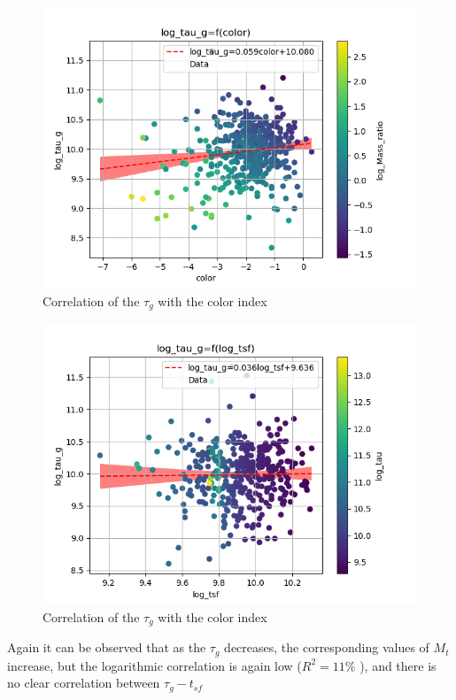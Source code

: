 \documentclass[a4paper,twocolumn]{article}
\begin{document}
\begin{figure}[!htpb]
\centering
\includegraphics[width=.9\linewidth]{./figs/color-log_tau_g-color_log_Mass_ratio.png}
\caption{\label{fig:Correlation of the $\tau_g$ with the color index}Correlation of the \(\tau_g\) with the color index}
\end{figure}

\begin{figure}[!htpb]
\centering
\includegraphics[width=.9\linewidth]{./figs/log_tsf-log_tau_g-color_log_tau.png}
\caption{\label{fig:Correlation of the $\tau_g$ with the color index}Correlation of the \(\tau_g\) with the color index}
\end{figure}

Again it can be observed that as the \(\tau_g\) decreases, the corresponding values of \(M_t\) increase, but the logarithmic correlation is again low (\(R^2 = 11\%\) \noindent), and there is no clear correlation between \(\tau_g-t_{sf}\)
\end{document}
